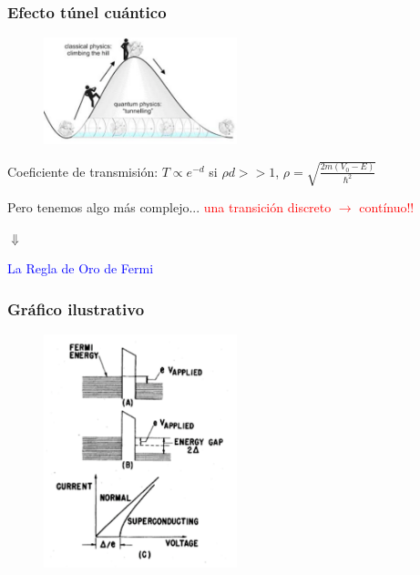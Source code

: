 \begin{frame}
\frametitle{Efecto t\'unel cu\'antico}

\begin{figure}[h!]
\centering
\includegraphics[width=0.5\textwidth]{tunnelling}
\end{figure}

Coeficiente de transmisi\'on: $T \propto e^{-d}$ \hspace{0.5cm} si $\rho d >>1$, $\rho=\sqrt{\frac{2m(V_0-E)}{\hbar^2}}$
\vspace{0.2cm}

\pause
\begin{center}
Pero tenemos algo m\'as complejo... \textcolor{red}{una transici\'on discreto $\rightarrow$ cont\'inuo!!}

$\Downarrow$

\textcolor{blue}{La Regla de Oro de Fermi}
\end{center}

\end{frame}
\begin{frame}
\frametitle{Gr\'afico ilustrativo}

\begin{figure}[!h] \label{fermi_levels2}
\includegraphics[width=0.5\textwidth]{fermi_levels2}
\end{figure}


\end{frame}
